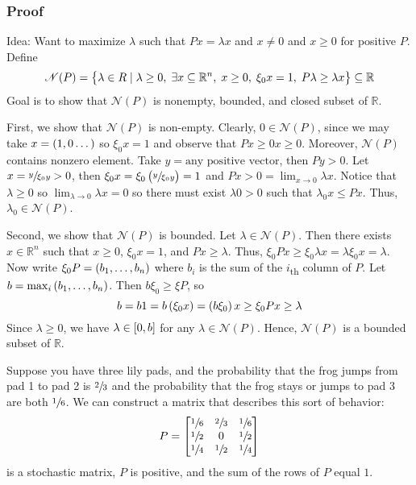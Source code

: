 \documentclass{article}
\newcommand{\m}[1]{\begin{bmatrix} #1 \end{bmatrix}}
\newcommand{\RR}{\mathbb{R}}
\begin{document}
\subsubsection{Proof}

Idea: Want to maximize \(\lambda\) such that \(Px = \lambda x\) and \(x \neq 0\) and \(x \geq 0\) for positive \(P\).
Define
\[\mathscr{N}(P) = \set{\lambda \in R \mid \lambda \geq 0,\;  \exists x \subseteq \RR^n,\; x \geq 0,\; \xi_0x = 1,\; P\lambda \geq \lambda x} \subseteq \RR\]
Goal is to show that \(\mathscr{N}(P)\) is nonempty, bounded, and closed subset of \(\RR\).

First, we show that \(\mathscr{N}(P)\) is non-empty.
Clearly, \(0 \in \mathscr N(P)\), since we may take \(x = \del{1, 0 \dots}\) so \(\xi_0x = 1\) and observe that \(Px \geq 0x \geq 0\).
Moreover, \(\mathscr N(P)\) contains nonzero element.
Take \(y = \text{any positive vector}\), then \(Py >  0\).
Let \(x = \sfrac{y}{\xi_0y} > 0\), then \(\xi_0x = \xi_0 \del{\sfrac{y}{\xi_0y}} = 1\) and \(Px > 0 = \lim_{x \to 0} \lambda x\).
Notice that \(\lambda \geq 0\) so \(\lim_{\lambda \to 0} \lambda x=0\) so there must exist \(\lambda 0 > 0\) such that \(\lambda_0 x \leq Px\).
Thus, \(\lambda_0 \in \mathscr N(P)\).

Second, we show that \(\mathscr N(P)\) is bounded.
Let \(\lambda \in \mathscr N(P)\).
Then there exists \(x \in \RR^n\) such that \(x \geq 0\), \(\xi_0x = 1\), and \(Px \geq \lambda \).
Thus, \(\xi_0 Px \geq \xi_0 \lambda x = \lambda\xi_0 x = \lambda\).
Now write \(\xi_0P = \del{b_1, \dots, b_n}\) where \(b_i\) is the sum of the \(i\)\textsubscript{th} column of \(P\).
Let \(b = \max_{i} \del{b_1, \dots, b_n}\).
Then \(b \xi_0 \geq \xi P\), so
\[b = b1 = b\del{\xi_0x} = \del{b\xi_0}x \geq \xi_0 Px \geq \lambda\]
Since \(\lambda \geq 0\), we have \(\lambda \in \intcc{0, b}\) for any \(\lambda \in \mathscr N(P)\).
Hence, \(\mathscr{N}(P)\) is a bounded subset of \(\RR\).
\begin{aside}
  Suppose you have three lily pads, and the probability that the frog jumps from pad 1 to pad 2 is \(\sfrac{2}{3}\) and the probability that the frog stays or jumps to pad 3 are both \(\sfrac{1}{6}\).
  We can construct a matrix that describes this sort of behavior:
  \[P=\m{\sfrac{1}{6} & \sfrac{2}{3} & \sfrac{1}{6}\\ \sfrac{1}{2} & 0 & \sfrac{1}{2} \\ \sfrac{1}{4} & \sfrac{1}{2} & \sfrac{1}{4}}\]
  is a stochastic matrix, \(P\) is positive, and the sum of the rows of \(P\) equal \(1\).
\end{aside}
\end{document}
